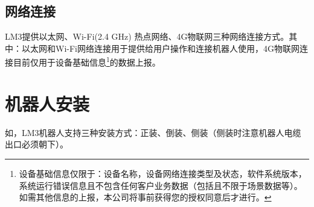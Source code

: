 
\subsection{网络连接}

LM3提供以太网、Wi-Fi(2.4 GHz) 热点网络、4G物联网三种网络连接方式。其中：以太网和Wi-Fi网络连接用于提供给用户操作和连接机器人使用，4G物联网连接目前仅用于设备基础信息\footnote{设备基础信息仅限于：设备名称，设备网络连接类型及状态，软件系统版本，系统运行错误信息且不包含任何客户业务数据（包括且不限于场景数据等）。如需其他信息的上报，本公司将事前获得您的授权同意后才进行。}的数据上报。



\section{机器人安装}

如，LM3机器人支持三种安装方式：正装、倒装、侧装（侧装时注意机器人电缆出口必须朝下）。

